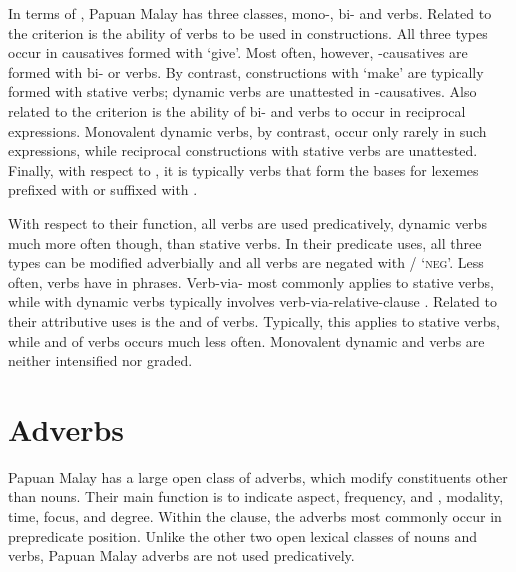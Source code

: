 In terms of , Papuan Malay has three  classes, mono-, bi- and  verbs. Related to the  criterion is the ability of verbs to be used in  constructions. All three  types occur in causatives formed with  ‘give’. Most often, however, -causatives are formed with bi- or  verbs. By contrast,  constructions with  ‘make’ are typically formed with stative verbs; dynamic verbs are unattested in -causatives. Also related to the  criterion is the ability of bi- and  verbs to occur in reciprocal expressions. Monovalent dynamic verbs, by contrast, occur only rarely in such expressions, while reciprocal constructions with stative verbs are unattested. Finally, with respect to , it is typically  verbs that form the bases for lexemes prefixed with  or suffixed with .



With respect to their function, all verbs are used predicatively, dynamic verbs much more often though, than stative verbs. In their predicate uses, all three  types can be modified adverbially and all verbs are negated with / ‘\textsc{neg}’. Less often, verbs have  in  phrases. Verb-via-  most commonly applies to stative verbs, while  with dynamic verbs typically involves verb-via-relative-clause . Related to their attributive uses is the  and  of verbs. Typically, this applies to  stative verbs, while  and  of  verbs occurs much less often. Monovalent dynamic and  verbs are neither intensified nor graded.


\section{Adverbs}
\largerpage
\label{Para_5.4}
Papuan Malay has a large open class of adverbs, which modify constituents other than nouns. Their main function is to indicate aspect, frequency,  and , modality, time, focus, and degree. Within the clause, the adverbs most commonly occur in prepredicate position. Unlike the other two open lexical classes of nouns and verbs, Papuan Malay adverbs are not used predicatively.



